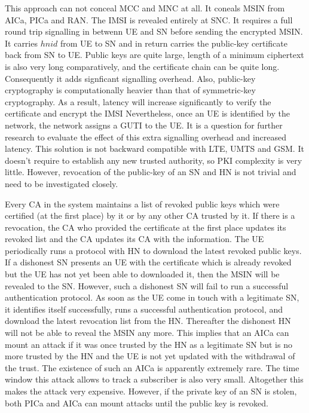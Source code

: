 \documentclass[lnicst,sechang,a4paper]{svmultln}
\begin{document}
This approach can not conceal MCC and MNC at all. It coneals MSIN from AICa, PICa and RAN. The IMSI is revealed entirely at SNC. It requires a full round trip signalling in betwenn UE and SN before sending the encrypted MSIN. It carries $hnid$ from UE to SN and in return carries the public-key certificate back from SN to UE. Public keys are quite large, length of a minimum ciphertext is also very long comparatively, and the certificate chain can be quite long. Consequently it adds signficant signalling overhead. Also, public-key cryptography is computationally heavier than that of symmetric-key cryptography. As a result, latency will increase significantly to verify the certificate and encrypt the IMSI Nevertheless, once an UE is identified by the network, the network assigns a GUTI to the UE. It is a question for further research to evaluate the effect of this extra signalling overhead and increased latency. This solution is not backward compatible with LTE, UMTS and GSM. It doesn't require to establish any new trusted authority, so PKI complexity is very little. However, revocation of the public-key of an SN and HN is not trivial and need to be investigated closely.

Every CA in the system maintains a list of revoked public keys which were certified (at the first place) by it or by any other CA trusted by it. If there is a revocation, the CA who provided the certificate at the first place updates its revoked list and the CA updates its CA with the information. The UE periodically runs a protocol with HN to download the latest revoked public keys. If a dishonest SN presents an UE with the certificate which is already revoked but the UE has not yet been able to downloaded it, then the MSIN will be revealed to the SN. However, such a dishonest SN will fail to run a successful authentication protocol. As soon as the UE come in touch with a legitimate SN, it identifies itself successfully, runs a successful authentication protocol, and download the latest revocation list from the HN. Thereafter the dishonest HN will not be able to reveal the MSIN any more. This implies that an AICa can mount an attack if it was once trusted by the HN as a legitimate SN but is no more trusted by the HN and the UE is not yet updated with the withdrawal of the trust. The existence of such an AICa is apparently extremely rare. The time window this attack allows to track a subscriber is also very small. Altogether this makes the attack very expensive. However, if the private key of an SN is stolen, both PICa and AICa can mount attacks until the public key is revoked. 
\end{document}
